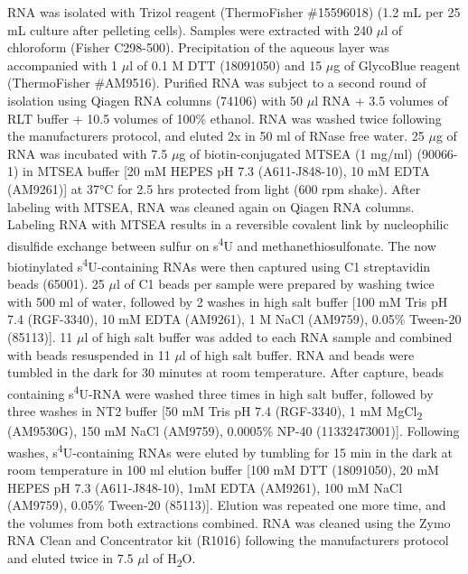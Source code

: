 \documentclass[times, twoside]{zHenriquesLab-StyleBioRxiv}
\begin{document}
RNA was isolated with Trizol reagent (ThermoFisher \#15596018) (1.2 mL per 25 mL culture after pelleting cells). Samples were extracted with 240 \(\mu\)l of chloroform (Fisher C298-500). Precipitation of the aqueous layer was accompanied with 1 \(\mu\)l of 0.1 M DTT (18091050) and 15 \(\mu\)g of GlycoBlue reagent (ThermoFisher \#AM9516). Purified RNA was subject to a second round of isolation using Qiagen RNA columns (74106) with 50 \(\mu\)l RNA + 3.5 volumes of RLT buffer + 10.5 volumes of 100\% ethanol. RNA was washed twice following the manufacturers protocol, and eluted 2x in 50 ml of RNase free water. 25 \(\mu\)g of RNA was incubated with 7.5 \(\mu\)g of biotin-conjugated MTSEA (1 mg/ml) (90066-1) in MTSEA buffer [20 mM HEPES pH 7.3 (A611-J848-10), 10 mM EDTA (AM9261)] at 37°C for 2.5 hrs protected from light (600 rpm shake). After labeling with MTSEA, RNA was cleaned again on Qiagen RNA columns. Labeling RNA with MTSEA results in a reversible covalent link by nucleophilic disulfide exchange between sulfur on s\textsuperscript{4}U and methanethiosulfonate. The now biotinylated s\textsuperscript{4}U-containing RNAs were then captured using C1 streptavidin beads (65001). 25 \(\mu\)l of C1 beads per sample were prepared by washing twice with 500 ml of water, followed by 2 washes in high salt buffer [100 mM Tris pH 7.4 (RGF-3340), 10 mM EDTA (AM9261), 1 M NaCl (AM9759), 0.05\% Tween-20 (85113)]. 11 \(\mu\)l of high salt buffer was added to each RNA sample and combined with beads resuspended in 11 \(\mu\)l of high salt buffer. RNA and beads were tumbled in the dark for 30 minutes at room temperature. After capture, beads containing s\textsuperscript{4}U-RNA were washed three times in high salt buffer, followed by three washes in NT2 buffer [50 mM Tris pH 7.4 (RGF-3340), 1 mM MgCl\textsubscript{2} (AM9530G), 150 mM NaCl (AM9759), 0.0005\% NP-40 (11332473001)]. Following washes, s\textsuperscript{4}U-containing RNAs were eluted by tumbling for 15 min in the dark at room temperature in 100 ml elution buffer [100 mM DTT (18091050), 20 mM HEPES pH 7.3 (A611-J848-10), 1mM EDTA (AM9261), 100 mM NaCl (AM9759), 0.05\% Tween-20 (85113)]. Elution was repeated one more time, and the volumes from both extractions combined. RNA was cleaned using the Zymo RNA Clean and Concentrator kit (R1016) following the manufacturers protocol and eluted twice in 7.5 \(\mu\)l of H\textsubscript{2}O. 
\end{document}
